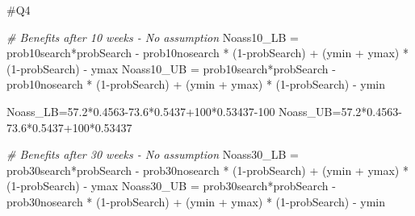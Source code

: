 \documentclass[
]{article}
\newenvironment{Shaded}{\begin{snugshade}}{\end{snugshade}}
\newcommand{\CommentTok}[1]{\textcolor[rgb]{0.56,0.35,0.01}{\textit{#1}}}
\newcommand{\DecValTok}[1]{\textcolor[rgb]{0.00,0.00,0.81}{#1}}
\newcommand{\FloatTok}[1]{\textcolor[rgb]{0.00,0.00,0.81}{#1}}
\newcommand{\FunctionTok}[1]{\textcolor[rgb]{0.00,0.00,0.00}{#1}}
\newcommand{\NormalTok}[1]{#1}
\newcommand{\OtherTok}[1]{\textcolor[rgb]{0.56,0.35,0.01}{#1}}
\newcommand{\SpecialCharTok}[1]{\textcolor[rgb]{0.00,0.00,0.00}{#1}}
\begin{document}
\#Q4

\begin{Shaded}
\end{Shaded}

\begin{Shaded}
\begin{Highlighting}[]
\CommentTok{\# Benefits after 10 weeks {-} No assumption}
\NormalTok{Noass10\_LB }\OtherTok{=}\NormalTok{ prob10search}\SpecialCharTok{*}\NormalTok{probSearch }\SpecialCharTok{{-}}\NormalTok{ prob10nosearch }\SpecialCharTok{*}\NormalTok{ (}\DecValTok{1}\SpecialCharTok{{-}}\NormalTok{probSearch) }\SpecialCharTok{+}\NormalTok{ (ymin }\SpecialCharTok{+}\NormalTok{ ymax) }\SpecialCharTok{*}\NormalTok{ (}\DecValTok{1}\SpecialCharTok{{-}}\NormalTok{probSearch) }\SpecialCharTok{{-}}\NormalTok{ ymax}
\NormalTok{Noass10\_UB }\OtherTok{=}\NormalTok{ prob10search}\SpecialCharTok{*}\NormalTok{probSearch }\SpecialCharTok{{-}}\NormalTok{ prob10nosearch }\SpecialCharTok{*}\NormalTok{ (}\DecValTok{1}\SpecialCharTok{{-}}\NormalTok{probSearch) }\SpecialCharTok{+}\NormalTok{ (ymin }\SpecialCharTok{+}\NormalTok{ ymax) }\SpecialCharTok{*}\NormalTok{ (}\DecValTok{1}\SpecialCharTok{{-}}\NormalTok{probSearch) }\SpecialCharTok{{-}}\NormalTok{ ymin}

\NormalTok{Noass\_LB}\OtherTok{=}\FloatTok{57.2}\SpecialCharTok{*}\FloatTok{0.4563{-}73.6}\SpecialCharTok{*}\FloatTok{0.5437}\SpecialCharTok{+}\DecValTok{100}\SpecialCharTok{*}\FloatTok{0.53437}\DecValTok{{-}100}
\NormalTok{Noass\_UB}\OtherTok{=}\FloatTok{57.2}\SpecialCharTok{*}\FloatTok{0.4563{-}73.6}\SpecialCharTok{*}\FloatTok{0.5437}\SpecialCharTok{+}\DecValTok{100}\SpecialCharTok{*}\FloatTok{0.53437}

\CommentTok{\# Benefits after 30 weeks {-} No assumption}
\NormalTok{Noass30\_LB }\OtherTok{=}\NormalTok{ prob30search}\SpecialCharTok{*}\NormalTok{probSearch }\SpecialCharTok{{-}}\NormalTok{ prob30nosearch }\SpecialCharTok{*}\NormalTok{ (}\DecValTok{1}\SpecialCharTok{{-}}\NormalTok{probSearch) }\SpecialCharTok{+}\NormalTok{ (ymin }\SpecialCharTok{+}\NormalTok{ ymax) }\SpecialCharTok{*}\NormalTok{ (}\DecValTok{1}\SpecialCharTok{{-}}\NormalTok{probSearch) }\SpecialCharTok{{-}}\NormalTok{ ymax}
\NormalTok{Noass30\_UB }\OtherTok{=}\NormalTok{ prob30search}\SpecialCharTok{*}\NormalTok{probSearch }\SpecialCharTok{{-}}\NormalTok{ prob30nosearch }\SpecialCharTok{*}\NormalTok{ (}\DecValTok{1}\SpecialCharTok{{-}}\NormalTok{probSearch) }\SpecialCharTok{+}\NormalTok{ (ymin }\SpecialCharTok{+}\NormalTok{ ymax) }\SpecialCharTok{*}\NormalTok{ (}\DecValTok{1}\SpecialCharTok{{-}}\NormalTok{probSearch) }\SpecialCharTok{{-}}\NormalTok{ ymin}
\end{Highlighting}
\end{Shaded}
\end{document}
